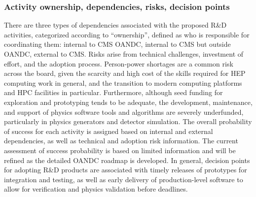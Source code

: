 \subsubsection{Activity ownership, dependencies, risks, decision points}
\label{sec:risks}
There are three types of dependencies associated with the proposed R\&D activities, categorized according to ``ownership'', defined as who is responsible for coordinating them: internal to CMS \gls{OANDC}, internal to CMS but outside \gls{OANDC}, external to CMS. Risks arise from technical challenges, investment of effort, and the adoption process. Person-power shortages are a common risk across the board, given the scarcity and high cost of the skills required for \gls{HEP} computing work in general, and the transition to modern computing platforms and \gls{HPC} facilities in particular. Furthermore, although seed funding for exploration and prototyping tends to be adequate, the development, maintenance, and support of physics software tools and algorithms are severely underfunded, particularly in physics generators and detector simulation. The overall probability of success for each activity is assigned based on internal and external dependencies, as well as technical and adoption risk information. The current assessment of success probability is based on limited information and will be refined as the detailed \gls{OANDC} \PhaseTwo roadmap is developed. In general, decision points for adopting R\&D products are associated with timely releases of prototypes for integration and testing, as well as early delivery of production-level software to allow for verification and physics validation before deadlines.

